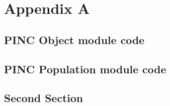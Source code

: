 \chapter{Appendix A}
\label{sec:appendixA}
\section{PINC Object module code}
\label{sec:ObjectCode}

\section{PINC Population module code}
\section{Second Section}
